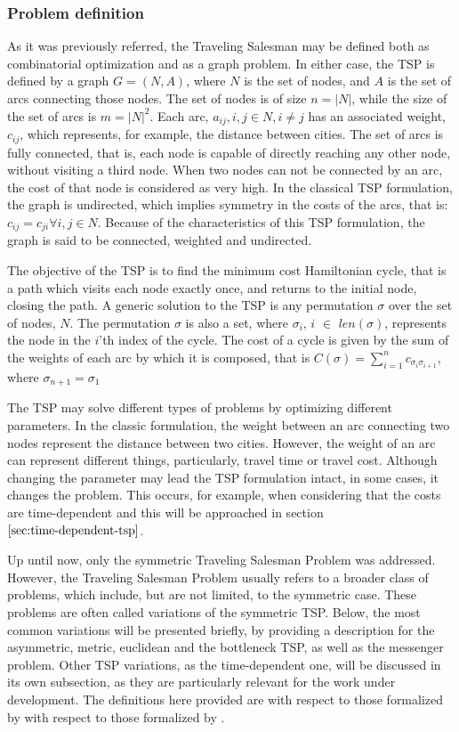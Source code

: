 \subsubsection{Problem definition}
\label{sec:classic_tsp}

As it was previously referred, the Traveling Salesman may be defined both as combinatorial optimization and as a graph problem. In either case, the TSP is defined by a graph $G = (N, A)$, where $N$ is the set of nodes, and $A$ is the set of arcs connecting those nodes. The set of nodes is of size $n = |N|$, while the size of the set of arcs is $m = |N|^2$. Each arc, $a_{ij}, i, j \in N, i \ne j$ has an associated weight, $c_{ij}$, which represents, for example, the distance between cities. The set of arcs is fully connected, that is, each node is capable of directly reaching any other node, without visiting a third node. When two nodes can not be connected by an arc, the cost of that node is considered as very high. In the classical TSP formulation, the graph is undirected, which implies symmetry in the costs of the arcs, that is: $c_{ij} = c_{ji} \forall i, j \in N$. Because of the characteristics of this TSP formulation, the graph is said to be connected, weighted and undirected.

The objective of the TSP is to find the minimum cost Hamiltonian cycle, that is a path which visits each node exactly once, and returns to the initial node, closing the path. A generic solution to the TSP is any permutation $\sigma$ over the set of nodes, $N$. The permutation $\sigma$ is also a set, where $\sigma_{i}$, $i$ $\in$ $len(\sigma)$, represents the node in the $i$'th index of the cycle. The cost of a cycle is given by the sum of the weights of each arc by which it is composed, that is $C(\sigma) = \sum_{i=1}^{n} c_{\sigma_{i} \sigma_{i+1}}$, where $\sigma_{n+1} = \sigma_{1}$

The TSP may solve different types of problems by optimizing different parameters. In the classic formulation, the weight between an arc connecting two nodes represent the distance between two cities. However, the weight of an arc can represent different things, particularly, travel time or travel cost. Although changing the parameter may lead the TSP formulation intact, in some cases, it changes the problem. This occurs, for example, when considering that the costs are time-dependent and this will be approached in section $\ref{sec:time-dependent-tsp}$.

Up until now, only the symmetric Traveling Salesman Problem was addressed. However, the Traveling Salesman Problem usually refers to a broader class of problems, which include, but are not limited, to the symmetric case. These problems are often called variations of the symmetric TSP. Below, the most common variations will be presented briefly, by providing a description for the asymmetric, metric, euclidean and the bottleneck TSP, as well as the messenger problem. Other TSP variations, as the time-dependent one, will be discussed in its own subsection, as they are particularly relevant for the work under development. The definitions here provided are with respect to those formalized by with respect to those formalized by \cite{tsp_book}.

